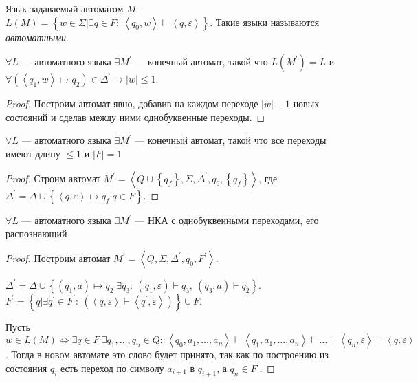 \begin{define*}
Язык задаваемый автоматом $M$ --- $L(M)=\left\{ w\in\Sigma|\exists q\in F:\ \left\langle q_{0},w\right\rangle \vdash\left\langle q,\varepsilon\right\rangle \right\} $.
Такие языки называются \emph{автоматными}.\end{define*}
\begin{lem}
$\forall L$ --- автоматного языка $\exists M^{\prime}$ --- конечный
автомат, такой что $L(M^{\prime})=L$ и $\forall\left(\left\langle q_{1},w\right\rangle \mapsto q_{2}\right)\in\Delta^{\prime}\rightarrow\left|w\right|\le1$.\end{lem}
\begin{proof}
Построим автомат явно, добавив на каждом переходе $\left|w\right|-1$
новых состояний и сделав между ними однобуквенные переходы.\end{proof}
\begin{lem}
$\forall L$ --- автоматного языка $\exists M^{\prime}$ --- конечный
автомат, такой что все переходы имеют длину $\le1$ и $\left|F\right|=1$\end{lem}
\begin{proof}
Строим автомат $M^{\prime}=\left\langle Q\cup\left\{ q_{f}\right\} ,\Sigma,\Delta^{\prime},q_{0},\left\{ q_{f}\right\} \right\rangle $,
где $\Delta^{\prime}=\Delta\cup\left\{ \left\langle q,\varepsilon\right\rangle \mapsto q_{f}|q\in F\right\} $.\end{proof}
\begin{lem}
$\forall L$ --- автоматного языка $\exists M^{\prime}$ --- НКА с
однобуквенными переходами, его распознающий\end{lem}
\begin{proof}
Построим автомат $M^{\prime}=\left\langle Q,\Sigma,\Delta^{\prime},q_{0},F^{\prime}\right\rangle $.

$\Delta^{\prime}=\Delta\cup\left\{ \left(q_{1},a\right)\mapsto q_{2}|\exists q_{3}:\ \left(q_{1},\varepsilon\right)\vdash q_{3},\ \left(q_{3},a\right)\vdash q_{2}\right\} $.
$F^{\prime}=\left\{ q|\exists q^{\prime}\in F^{\prime}:\ \left(\left\langle q,\varepsilon\right\rangle \vdash\left\langle q^{\prime},\varepsilon\right\rangle \right)\right\} \cup F$.

Пусть $w\in L(M)\Leftrightarrow\exists q\in F\ \exists q_{1},\ldots,q_{n}\in Q:\ \left\langle q_{0},a_{1},\ldots,a_{n}\right\rangle \vdash\left\langle q_{1},a_{1},\ldots,a_{n}\right\rangle \vdash\ldots\vdash\left\langle q_{n},\varepsilon\right\rangle \vdash\left\langle q,\varepsilon\right\rangle $.
Тогда в новом автомате это слово будет принято, так как по построению
из состояния $q_{i}$ есть переход по символу $a_{i+1}$ в $q_{i+1}$,
а $q_{n}\in F^{\prime}$.\end{proof}
